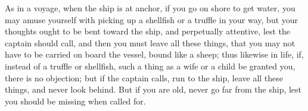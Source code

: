 As in a  voyage, when the ship is at  anchor, if you go on shore  to get water,
you may amuse  yourself with picking up  a shellfish or a truffle  in your way,
but your thoughts ought to be  bent toward the ship, and perpetually attentive,
lest the captain  should call, and then  you must leave all  these things, that
you may not  have to be carried on  board the vessel, bound like  a sheep; thus
likewise in life, if, instead of a truffle or shellfish, such a thing as a wife
or a child be granted you, there is no objection; but if the captain calls, run
to the ship, leave all these things, and never look behind. But if you are old,
never go far from the ship, lest you should be missing when called for.
